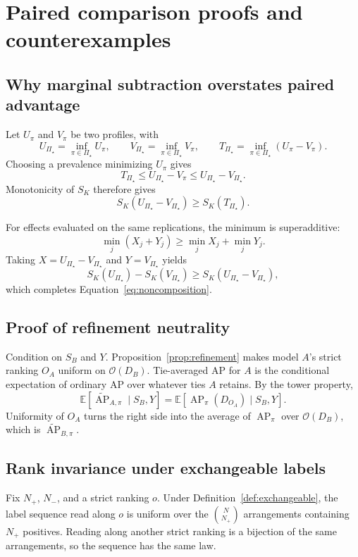 \documentclass[11pt]{article}
\newcommand{\AP}{\operatorname{AP}}
\newcommand{\PSet}{\Pi_\star}
\newcommand{\E}{\mathbb{E}}
\newcommand{\APta}{\widetilde{\AP}}
\theoremstyle{remark}
\begin{document}
\section{Paired comparison proofs and counterexamples}
\label{app:paired-proofs}

\subsection{Why marginal subtraction overstates paired advantage}

Let $U_\pi$ and $V_\pi$ be two profiles, with
\[
U_{\PSet}=\inf_{\pi\in\PSet}U_\pi,
\qquad
V_{\PSet}=\inf_{\pi\in\PSet}V_\pi,
\qquad
T_{\PSet}=\inf_{\pi\in\PSet}(U_\pi-V_\pi).
\]
Choosing a prevalence minimizing $U_\pi$ gives
\[
T_{\PSet}
\leq
U_{\PSet}-V_\pi
\leq
U_{\PSet}-V_{\PSet}.
\]
Monotonicity of $S_K$ therefore gives
\[
S_K(U_{\PSet}-V_{\PSet})
\geq
S_K(T_{\PSet}).
\]

For effects evaluated on the same replications, the minimum is superadditive:
\[
\min_j(X_j+Y_j)
\geq
\min_jX_j+\min_jY_j.
\]
Taking $X=U_{\PSet}-V_{\PSet}$ and $Y=V_{\PSet}$ yields
\[
S_K(U_{\PSet})-S_K(V_{\PSet})
\geq
S_K(U_{\PSet}-V_{\PSet}),
\]
which completes Equation~\eqref{eq:noncomposition}.

\subsection{Proof of refinement neutrality}

Condition on $S_B$ and $Y$. Proposition~\ref{prop:refinement} makes model $A$'s strict ranking $O_A$ uniform on $\mathcal O(D_B)$. Tie-averaged AP for $A$ is the conditional expectation of ordinary AP over whatever ties $A$ retains. By the tower property,
\[
\E[\APta_{A,\pi}\mid S_B,Y]
=
\E[\AP_\pi(D_{O_A})\mid S_B,Y].
\]
Uniformity of $O_A$ turns the right side into the average of $\AP_\pi$ over $\mathcal O(D_B)$, which is $\APta_{B,\pi}$.

\subsection{Rank invariance under exchangeable labels}

Fix $N_+$, $N_-$, and a strict ranking $o$. Under Definition~\ref{def:exchangeable}, the label sequence read along $o$ is uniform over the $\binom N{N_+}$ arrangements containing $N_+$ positives. Reading along another strict ranking is a bijection of the same arrangements, so the sequence has the same law.
\end{document}

